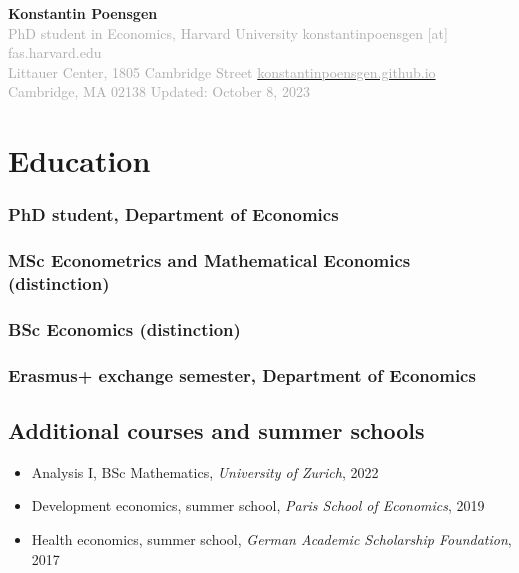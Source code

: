 \documentclass[a4paper, english, 10pt]{cv_class}
\renewcommand{\maketitle}{\bgroup\setlength{\parindent}{0pt}
	\begin{flushleft}
		{\Large \bfseries Konstantin Poensgen} \\ 
		\vspace{3pt}
		\textcolor{darkgray}{PhD student in Economics, Harvard University} \hfill 
		\textcolor{darkgray}{konstantinpoensgen [at] fas.harvard.edu} \\
		\textcolor{darkgray}{Littauer Center, 1805 Cambridge Street} \hfill 
		\href{https://konstantinpoensgen.github.io}{\textcolor{darkgray}{konstantinpoensgen.github.io}} \\
		\textcolor{darkgray}{Cambridge, MA 02138} \hfill 
		\hfill \textcolor{darkgray}{Updated: October 8, 2023}
	\end{flushleft}\egroup
}
\begin{document}

\maketitle 

\vspace{-10pt}


\section{Education}

\subsubsection{PhD student, Department of Economics}

\subsubsection{MSc Econometrics and Mathematical Economics (distinction)}

\subsubsection{BSc Economics (distinction)}

\subsubsection{Erasmus+ exchange semester, Department of Economics}

\subsection{Additional courses and summer schools}
\begin{itemize}[noitemsep]
	\item Analysis I, BSc Mathematics, \textit{University of Zurich}, 2022
	\item Development economics, summer school, \textit{Paris School of Economics}, 2019
	\item Health economics, summer school, \textit{German Academic Scholarship Foundation}, 2017
\end{itemize}
\end{document}

